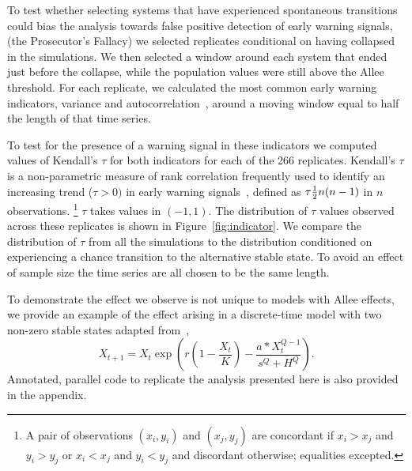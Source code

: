 \documentclass[authoryear,review,12pt]{elsarticle}
\begin{document}
To test whether selecting systems that have experienced
spontaneous transitions could bias the analysis towards false
positive detection of early warning signals, (the Prosecutor's
Fallacy) we selected replicates conditional on having collapsed
in the simulations.  We then selected a window around each system
that ended just before the collapse, while the population values
were still above the Allee threshold.  For each replicate, we
calculated the most common early warning indicators, variance and
autocorrelation~\citep[\emph{e.g.}][]{Carpenter2006,Dakos2008,Scheffer2009},
around a moving window equal to half the length of that time series.


To test for the presence of a warning signal in these indicators we
computed values of Kendall's $\tau$ for both indicators for each of
the 266 replicates.  Kendall's $\tau$ is a non-parametric measure
of rank correlation frequently used to identify an increasing trend
($\tau > 0 )$ in early warning signals~\citep{Dakos2008, Dakos2011},
defined as $\tau \def \tfrac{(\text{number of concordant pairs}) -
(\text{number of discordant pairs})}{\frac{1}{2} n (n-1) }$ in $n$
observations.  \footnote{A pair of observations $(x_i,y_i)$ and $(x_j,
y_j)$ are concordant if $x_i > x_j$ and $y_i > y_j$ or $x_i < x_j$ and
$y_i < y_j$ and discordant otherwise; equalities excepted.}  $\tau$ takes
values in $(-1, 1)$.  The distribution of $\tau$ values observed across
these replicates is shown in Figure~\ref{fig:indicator}.  We compare
the distribution of $\tau$ from all the simulations to the distribution
conditioned on experiencing a chance transition to the alternative
stable state.  To avoid an effect of sample size the time series are
all chosen to be the same length.


To demonstrate the effect we observe is not unique to models with Allee
effects, we provide an example of the effect arising in a discrete-time
model with two non-zero stable states adapted from~\citep{May1977},
\begin{equation}
X_{t+1} = X_t \exp\left( r \left(1 - \frac{ X_t }{ K } \right) - \frac{ a * X_t ^ {Q - 1} }{s ^ Q + H ^ Q} \right). \label{May1977}
\end{equation}
Annotated, parallel code to replicate the analysis presented here is
also provided in the appendix.
\end{document}
